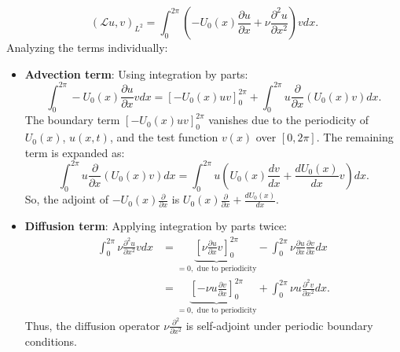 \begin{equation}
    (\mathcal{L}u, v)_{L^2} = \int_0^{2\pi} \left( -U_0(x) \frac{\partial u}{\partial x} + \nu \frac{\partial^2 u}{\partial x^2} \right) v dx.
    \label{eq:adjoint_l_star_integral}
\end{equation}
Analyzing the terms individually:
\begin{itemize}
    \item \textbf{Advection term}: Using integration by parts:
          \begin{equation}
              \int_0^{2\pi} - U_0 (x) \frac{\partial u}{\partial x} v dx = \left [ -U_0(x) u v \right]_0^{2\pi} + \int_0^{2\pi} u \frac{\partial}{\partial x} \left ( U_0(x) v\right) dx.
              \label{eq:adv_term_parts}
          \end{equation}
          The boundary term $\left [ -U_0(x) u v \right]_0^{2\pi}$ vanishes due to the periodicity of $U_0(x)$, $u(x,t)$, and the test function $v(x)$ over $[0, 2\pi]$. The remaining term is expanded as:
          \begin{equation}
              \int_0^{2\pi} u \frac{\partial}{\partial x} \left ( U_0(x) v\right) dx = \int_0^{2\pi} u \left ( U_0(x) \frac{dv}{dx} +  \frac{d U_0(x)}{d x} v \right) dx.
              \label{eq:adv_term_expanded}
          \end{equation}
          So, the adjoint of $-U_0(x) \frac{\partial}{\partial x}$ is $U_0(x) \frac{\partial}{\partial x} + \frac{d U_0(x)}{dx}$.
    \item \textbf{Diffusion term}: Applying integration by parts twice:
          \begin{equation}
              \begin{aligned}
                  \int_0^{2 \pi} \nu \frac{\partial^2 u }{\partial x^2} v dx & = \underbrace{\left [ \nu \frac{\partial u}{\partial x} v \right]_0^{2\pi}}_{=0, \text{ due to periodicity}} - \int_0^{2\pi} \nu \frac{\partial u}{\partial x} \frac{\partial v}{\partial x} dx \\
                                                                         & =  \underbrace{\left [ -\nu u \frac{\partial v}{\partial x} \right]_0^{2\pi}}_{=0, \text{ due to periodicity}} + \int_0^{2\pi} \nu u \frac{\partial^2 v}{\partial x^2} dx.
                  \label{eq:diff_term_parts}
              \end{aligned}
          \end{equation}
          Thus, the diffusion operator $\nu \frac{\partial^2}{\partial x^2}$ is self-adjoint under periodic boundary conditions.
\end{itemize}
